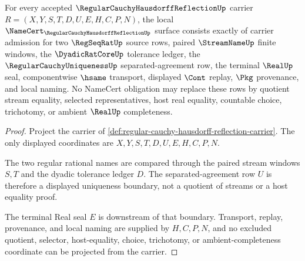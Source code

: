 \begin{theorem}
\label{thm:regular-cauchy-hausdorff-reflection-namecert-obligations}
For every accepted $\RegularCauchyHausdorffReflectionUp$ carrier $R=(X,Y,S,T,D,U,E,H,C,P,N)$, the local $\NameCert_{\RegularCauchyHausdorffReflectionUp}$ surface consists exactly of carrier admission for two $\RegSeqRatUp$ source rows, paired $\StreamNameUp$ finite windows, the $\DyadicRatCoreUp$ tolerance ledger, the $\RegularCauchyUniquenessUp$ separated-agreement row, the terminal $\RealUp$ seal, componentwise $\hsame$ transport, displayed $\Cont$ replay, $\Pkg$ provenance, and local naming. No NameCert obligation may replace these rows by quotient stream equality, selected representatives, host real equality, countable choice, trichotomy, or ambient $\RealUp$ completeness.
\end{theorem}
\begin{proof}
Project the carrier of \autoref{def:regular-cauchy-hausdorff-reflection-carrier}. The only displayed coordinates are $X,Y,S,T,D,U,E,H,C,P,N$.

The two regular rational names are compared through the paired stream windows $S,T$ and the dyadic tolerance ledger $D$. The separated-agreement row $U$ is therefore a displayed uniqueness boundary, not a quotient of streams or a host equality proof.

The terminal Real seal $E$ is downstream of that boundary. Transport, replay, provenance, and local naming are supplied by $H,C,P,N$, and no excluded quotient, selector, host-equality, choice, trichotomy, or ambient-completeness coordinate can be projected from the carrier.
\end{proof}

